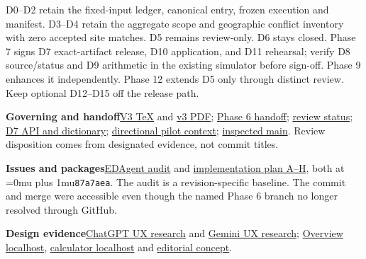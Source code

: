 \documentclass[11pt,a4paper]{article}
\newcommand{\code}[1]{{\Urlmuskip=0mu plus 1mu\relax\nolinkurl{#1}}}
\newcommand{\sub}[1]{\par\smallskip{\large\bfseries #1}\par}
\newcommand{\lead}[2]{\textbf{#1}\enspace #2\par}
\newcommand{\lib}[2]{\href{https://chatgpt.com/library?file_id=#1\&account_id=personal}{#2}}
\newcommand{\repo}[2]{\href{https://github.com/ExploratoryDataAnalysis/EDAgent/#1}{#2}}
\begin{document}
\sub{V3 release obligations}
D0--D2 retain the fixed-input ledger, canonical entry, frozen execution and manifest. D3--D4 retain the aggregate scope and geographic conflict inventory with zero accepted site matches. D5 remains review-only. D6 stays closed. Phase 7 signs D7 exact-artifact release, D10 application, and D11 rehearsal; verify D8 source/status and D9 arithmetic in the existing simulator before sign-off. Phase 9 enhances it independently. Phase 12 extends D5 only through distinct review. Keep optional D12--D15 off the release path.
\sub{Source record}
\lead{Governing and handoff}{\lib{libfile_09c025eb71308191a73c321da0f26318}{V3 TeX} and \lib{libfile_919f39c5968c8191b2b6ac25646f7ae4}{v3 PDF}; \repo{blob/bcdf44d/docs/phase6_handoff.md}{Phase 6 handoff}; \repo{blob/93991e5/docs/phase3_phase4_review_status.md}{review status}; \repo{blob/bcdf44d/docs/descriptive_release_data_dictionary.md}{D7 API and dictionary}; \repo{commit/ca3197c}{directional pilot context}; \repo{commit/93991e5}{inspected main}. Review disposition comes from designated evidence, not commit titles.}
\lead{Issues and packages}{\lib{libfile_0cd101eb6b188191ae9378a5b07393c1}{EDAgent audit} and \lib{libfile_a6ec072a59c88191b85c6acb329bb373}{implementation plan A--H}, both at \code{87a7aea}. The audit is a revision-specific baseline. The commit and merge were accessible even though the named Phase 6 branch no longer resolved through GitHub.}
\lead{Design evidence}{\lib{libfile_069033a2f0a08191a055a614290e4e5c}{ChatGPT UX research} and \lib{libfile_fc9c1dc69af08191ad4fc186885ebd4f}{Gemini UX research}; \lib{libfile_115366c4a3b8819196cd824b1015c3f5}{Overview localhost}, \lib{libfile_7ee61624df50819192e52bd35efaa0e9}{calculator localhost} and \lib{libfile_bc3d7fe90d4c8191952197466a1992aa}{editorial concept}.}
\end{document}
